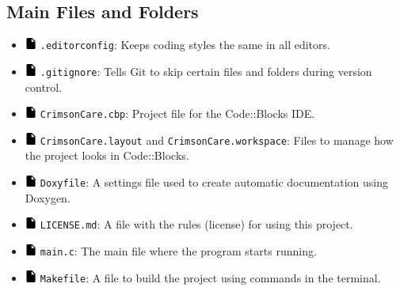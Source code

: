 \documentclass[12pt,a4paper]{report}
\begin{document}
\subsection*{Main Files and Folders}
\begin{itemize}
    \item \includegraphics[width=0.03\textwidth]{../resources/assets/images/file_icon.png} \texttt{.editorconfig}: Keeps coding styles the same in all editors.
    \item \includegraphics[width=0.03\textwidth]{../resources/assets/images/file_icon.png} \texttt{.gitignore}: Tells Git to skip certain files and folders during version control.
    \item \includegraphics[width=0.03\textwidth]{../resources/assets/images/file_icon.png} \texttt{CrimsonCare.cbp}: Project file for the Code::Blocks IDE.\
    \item \includegraphics[width=0.03\textwidth]{../resources/assets/images/file_icon.png} \texttt{CrimsonCare.layout} and \texttt{CrimsonCare.workspace}: Files to manage how the project looks in Code::Blocks.
    \item \includegraphics[width=0.03\textwidth]{../resources/assets/images/file_icon.png} \texttt{Doxyfile}: A settings file used to create automatic documentation using Doxygen.
    \item \includegraphics[width=0.03\textwidth]{../resources/assets/images/file_icon.png} \texttt{LICENSE.md}: A file with the rules (license) for using this project.
    \item \includegraphics[width=0.03\textwidth]{../resources/assets/images/file_icon.png} \texttt{main.c}: The main file where the program starts running.
    \item \includegraphics[width=0.03\textwidth]{../resources/assets/images/file_icon.png} \texttt{Makefile}: A file to build the project using commands in the terminal.

\end{itemize}
\end{document}
